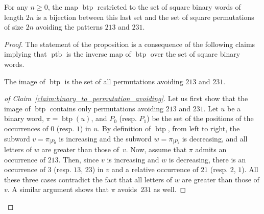 \documentclass[a4paper,10pt]{llncs}
\DeclareMathOperator{\BINTOPERM}{\mathrm{btp}}
\DeclareMathOperator{\PERMTOBIN}{\mathrm{ptb}}
\begin{document}
\begin{proposition} \label{prop:bijection_binary_to_permutations_squares}
    For any $n \geq 0$, the map $\BINTOPERM$ restricted to the set of
    square binary words of length $2n$ is a bijection between this last
    set and the set of square permutations of size $2n$ avoiding the
    patterns $213$ and $231$.
\end{proposition}
\begin{proof}
    The statement of the proposition is a consequence of the
    following claims implying that $\PERMTOBIN$ is the inverse
    map of $\BINTOPERM$ over the set of square binary words.
    \begin{claim} \label{claim:binary_to_permutation_avoiding}
        The image of $\BINTOPERM$ is the set of all permutations
        avoiding $213$ and $231$.
    \end{claim}
    \begin{proof}[of Claim~\ref{claim:binary_to_permutation_avoiding}]
        Let us first show that the image of $\BINTOPERM$ contains only
        permutations avoiding $213$ and $231$. Let $u$ be a binary word,
        $\pi = \BINTOPERM(u)$, and $P_0$ (resp. $P_1$) be the set of the
        positions of the occurrences of $0$ (resp. $1$) in $u$. By
        definition of $\BINTOPERM$, from left to right, the subword
        $v = \pi_{|P_0}$ is increasing and the subword $w = \pi_{|P_1}$
        is decreasing, and all letters of $w$ are greater than those
        of~$v$. Now, assume that $\pi$ admits an occurrence of $213$.
        Then, since $v$ is increasing and $w$ is decreasing, there is an
        occurrence of $3$ (resp. $13$, $23$) in $v$ and a relative
        occurrence of $21$ (resp. $2$, $1$). All these three cases
        contradict the fact that all letters of $w$ are greater than
        those of $v$. A similar argument shows that $\pi$ avoids~$231$
        as well.
        \smallskip


\end{proof}
\end{proof}
\end{document}
